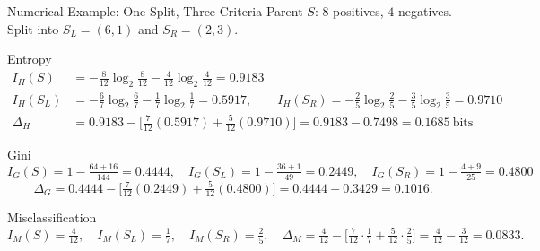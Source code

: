 \documentclass[11pt,aspectratio=169]{beamer}
\begin{document}
\begin{frame}{Numerical Example: One Split, Three Criteria}\footnotesize
Parent $S$: $8$ positives, $4$ negatives. Split into $S_L=(6,1)$ and $S_R=(2,3)$.
\begin{derivation}{Entropy}
\begin{align*}
I_H(S)&=-\tfrac{8}{12}\log_2\tfrac{8}{12}-\tfrac{4}{12}\log_2\tfrac{4}{12}=0.9183\\
I_H(S_L)&=-\tfrac67\log_2\tfrac67-\tfrac17\log_2\tfrac17=0.5917,\qquad
I_H(S_R)=-\tfrac25\log_2\tfrac25-\tfrac35\log_2\tfrac35=0.9710\\
\Delta_H&=0.9183-\bigl[\tfrac{7}{12}(0.5917)+\tfrac{5}{12}(0.9710)\bigr]=0.9183-0.7498=0.1685\ \text{bits}
\end{align*}
\end{derivation}
\begin{derivation}{Gini}
\[
I_G(S)=1-\tfrac{64+16}{144}=0.4444,\quad I_G(S_L)=1-\tfrac{36+1}{49}=0.2449,\quad I_G(S_R)=1-\tfrac{4+9}{25}=0.4800
\]
\[
\Delta_G=0.4444-\bigl[\tfrac{7}{12}(0.2449)+\tfrac{5}{12}(0.4800)\bigr]=0.4444-0.3429=0.1016 .
\]
\end{derivation}
\begin{derivation}{Misclassification}
\[
I_M(S)=\tfrac{4}{12},\quad I_M(S_L)=\tfrac17,\quad I_M(S_R)=\tfrac25,\quad
\Delta_M=\tfrac{4}{12}-\bigl[\tfrac{7}{12}\cdot\tfrac17+\tfrac{5}{12}\cdot\tfrac25\bigr]=\tfrac{4}{12}-\tfrac{3}{12}=0.0833 .
\]
\end{derivation}
\end{frame}

\end{document}
